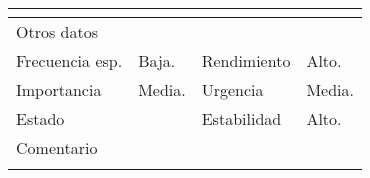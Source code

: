\documentclass{article}
\begin{document}
\begin{table}[h]
\begin{tabular}{|l|l|l|l|l|l|}
\hline
\multicolumn{1}{|p{1cm}}{} & \multicolumn{5}{|p{9cm}|}{}\\
\hline
\multicolumn{6}{|p{10cm}|}{Otros datos}\\
\hline
\multicolumn{1}{|p{2cm}|}{Frecuencia esp.} & \multicolumn{2}{p{3cm}}{Baja.} & \multicolumn{1}{|p{2cm}|}{Rendimiento} & \multicolumn{2}{p{3cm}|}{Alto.}\\
\hline
\multicolumn{1}{|p{2cm}|}{Importancia} & \multicolumn{2}{p{3cm}}{Media.} & \multicolumn{1}{|p{2cm}|}{Urgencia} & \multicolumn{2}{p{3cm}|}{Media.}\\
\hline
\multicolumn{1}{|p{2cm}|}{Estado} & \multicolumn{2}{p{3cm}}{} & \multicolumn{1}{|p{2cm}|}{Estabilidad} & \multicolumn{2}{p{3cm}|}{Alto.}\\
\hline
\multicolumn{6}{|p{10cm}|}{Comentario}\\
\hline
\multicolumn{6}{|p{10cm}|}{}\\
\hline
\end{tabular}
\end{table}
\end{document}
